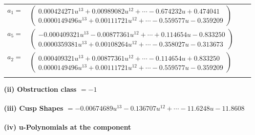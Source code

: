 \documentclass[1p]{elsarticle_modified}
\theoremstyle{definition}
\begin{document}
\begin{tabular}{m{7pt} m{180pt} m{7pt} m{180pt} }
\flushright $a_{1}=$&$\begin{pmatrix}0.000424271 u^{13}+0.00989082 u^{12}+\cdots-0.674232 u+0.474041\\0.0000149496 u^{13}+0.00111721 u^{12}+\cdots-0.559577 u-0.359209\end{pmatrix}$ \\
\flushright $a_{5}=$&$\begin{pmatrix}-0.000409321 u^{13}-0.00877361 u^{12}+\cdots+0.114654 u-0.833250\\0.0000359381 u^{13}+0.00108264 u^{12}+\cdots-0.358027 u-0.313673\end{pmatrix}$ \\
\flushright $a_{2}=$&$\begin{pmatrix}0.000409321 u^{13}+0.00877361 u^{12}+\cdots-0.114654 u+0.833250\\0.0000149496 u^{13}+0.00111721 u^{12}+\cdots-0.559577 u-0.359209\end{pmatrix}$\\&\end{tabular}
\flushleft \textbf{(ii) Obstruction class $= -1$}\\~\\
\flushleft \textbf{(iii) Cusp Shapes $= -0.00674689 u^{13}-0.136707 u^{12}+\cdots-11.6248 u-11.8608$}\\~\\
\newpage\renewcommand{\arraystretch}{1}
\flushleft \textbf{(iv) u-Polynomials at the component}\newline \\
\end{document}
